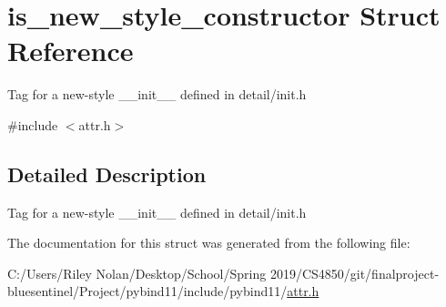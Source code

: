 \hypertarget{structis__new__style__constructor}{}\section{is\+\_\+new\+\_\+style\+\_\+constructor Struct Reference}
\label{structis__new__style__constructor}


Tag for a new-\/style {\ttfamily \+\_\+\+\_\+init\+\_\+\+\_\+} defined in {\ttfamily detail/init.\+h}  




{\ttfamily \#include $<$attr.\+h$>$}



\subsection{Detailed Description}
Tag for a new-\/style {\ttfamily \+\_\+\+\_\+init\+\_\+\+\_\+} defined in {\ttfamily detail/init.\+h} 

The documentation for this struct was generated from the following file\+:\begin{DoxyCompactItemize}
\item 
C\+:/\+Users/\+Riley Nolan/\+Desktop/\+School/\+Spring 2019/\+C\+S4850/git/finalproject-\/bluesentinel/\+Project/pybind11/include/pybind11/\mbox{\hyperlink{attr_8h}{attr.\+h}}\end{DoxyCompactItemize}
